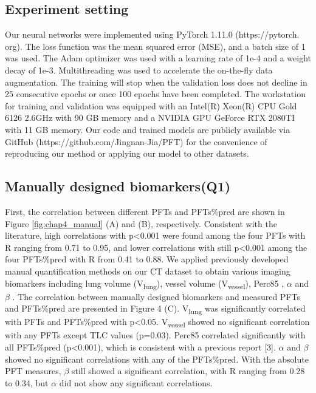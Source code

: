 \subsection{Experiment setting}
Our neural networks were implemented using PyTorch 1.11.0 (https://pytorch. org). The loss function was the mean squared error (MSE), and a batch size of 1 was used. The Adam optimizer was used with a learning rate of 1e-4 and a weight decay of 1e-3. Multithreading was used to accelerate the on-the-fly data augmentation. The training will stop when the validation loss does not decline in 25 consecutive epochs or once 100 epochs have been completed. The workstation for training and validation was equipped with an Intel(R) Xeon(R) CPU Gold 6126 2.6GHz with 90 GB memory and a NVIDIA GPU GeForce RTX 2080TI with 11 GB memory. Our code and trained models are publicly available via GitHub (https://github.com/Jingnan-Jia/PFT) for the convenience of reproducing our method or applying our model to other datasets.

\subsection{Manually designed biomarkers(Q1)}
First, the correlation between different PFTs and PFTs\%pred are shown in Figure \ref{fig:chap4_manual} (A) and (B), respectively. Consistent with the literature, high correlations with p<0.001 were found among the four PFTs with R ranging from 0.71 to 0.95, and lower correlations with still p<0.001 among the four PFTs\%pred with R from 0.41 to 0.88. We applied previously developed manual quantification methods on our CT dataset to obtain various imaging biomarkers including lung volume (V\textsubscript{lung}), vessel volume (V\textsubscript{vessel}), Perc85 \cite{Ninaber2015}, $\alpha$ and $\beta$ \cite{Zhai2019}. The correlation between manually designed biomarkers and measured PFTs and PFTs\%pred are presented in Figure 4 (C). V\textsubscript{lung} was significantly correlated with PFTs and PFTs\%pred with p<0.05. V\textsubscript{vessel} showed no significant correlation with any PFTs except TLC values (p=0.03). Perc85 correlated significantly with all PFTs\%pred (p<0.001), which is consistent with a previous report [3]. $\alpha$ and $\beta$ showed no significant correlations with any of the PFTs\%pred. With the absolute PFT measures, $\beta$ still showed a significant correlation, with R ranging from 0.28 to 0.34, but $\alpha$ did not show any significant correlations.  


